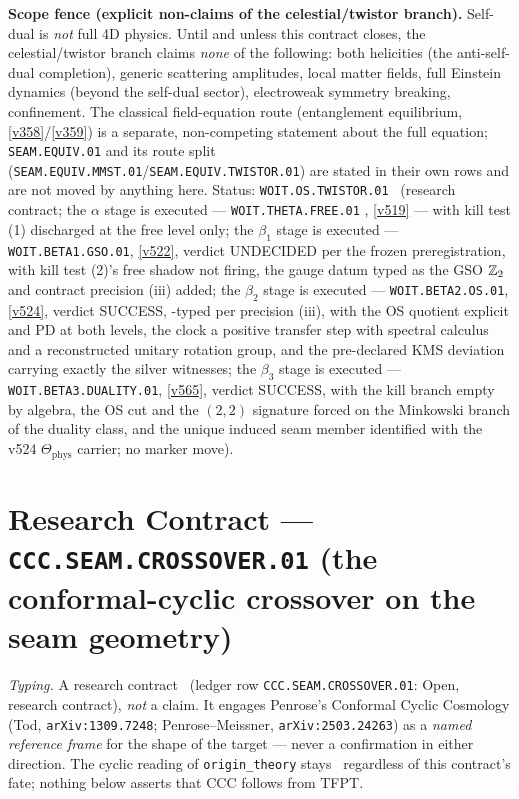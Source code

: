 \par\smallskip\noindent\textbf{Scope fence (explicit non-claims of the celestial/twistor branch).}
Self-dual is \emph{not} full 4D physics. Until and unless this contract closes, the celestial/twistor
branch claims \emph{none} of the following: both helicities (the anti-self-dual completion), generic
scattering amplitudes, local matter fields, full Einstein dynamics (beyond the self-dual sector),
electroweak symmetry breaking, confinement. The classical field-equation route (entanglement
equilibrium, \vref{v358}/\vref{v359}) is a separate, non-competing statement about the full equation;
\texttt{SEAM.EQUIV.01} and its route split (\texttt{SEAM.EQUIV.MMST.01}/\texttt{SEAM.EQUIV.TWISTOR.01})
are stated in their own rows and are not moved by anything here. Status:
\texttt{WOIT.OS.TWISTOR.01} \mO\ (research contract; the $\alpha$ stage is executed ---
\texttt{WOIT.THETA.FREE.01} \mE, \vref{v519} --- with kill test (1) discharged at the free level
only; the $\beta_1$ stage is executed --- \texttt{WOIT.BETA1.GSO.01}, \vref{v522}, verdict
UNDECIDED per the frozen preregistration, with kill test (2)'s free shadow not firing, the
gauge datum typed as the GSO $\mathbb Z_2$ and contract precision (iii) added; the $\beta_2$ stage
is executed --- \texttt{WOIT.BETA2.OS.01}, \vref{v524}, verdict SUCCESS, \mC-typed per
precision (iii), with the OS quotient explicit and PD at both levels, the clock a positive
transfer step with spectral calculus and a reconstructed unitary rotation group, and the
pre-declared KMS deviation carrying exactly the silver witnesses; the $\beta_3$ stage is
executed --- \texttt{WOIT.BETA3.DUALITY.01}, \vref{v565}, verdict SUCCESS, with the kill
branch empty by algebra, the OS cut and the $(2,2)$ signature forced on the Minkowski branch
of the duality class, and the unique induced seam member identified with the v524
$\Theta_{\mathrm{phys}}$ carrier; no marker move).


\section*{Research Contract --- \texttt{CCC.SEAM.CROSSOVER.01} (the conformal-cyclic crossover on the seam geometry)}
\noindent\emph{Typing.} A research contract \mO\ (ledger row \texttt{CCC.SEAM.CROSSOVER.01}:
Open, research contract), \emph{not} a claim.  It engages Penrose's Conformal Cyclic Cosmology
(Tod, \texttt{arXiv:1309.7248}; Penrose--Meissner, \texttt{arXiv:2503.24263}) as a \emph{named
reference frame} for the shape of the target --- never a confirmation in either direction.  The
cyclic reading of \texttt{origin\_theory} stays \mC\ regardless of this contract's fate; nothing
below asserts that CCC follows from TFPT.


